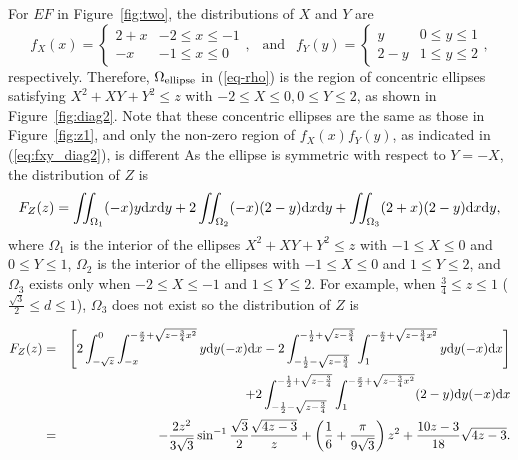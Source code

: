 \documentclass[12pt,draftclsnofoot,onecolumn]{IEEEtran}
\begin{document}
For $EF$ in Figure~\ref{fig:two}, the distributions of $X$ and $Y$ are
\begin{equation}\label{eq:fxy_diag2}
  f_X(x)=\left\{
    \begin{array}{lr}
      2+x & -2\leq x \leq -1 \\
      -x & -1 \leq x \leq 0
    \end{array}
  \right.,
  ~~\mbox{ and }~~ f_Y(y)=\left\{
    \begin{array}{lr}
      y & 0\leq y \leq 1 \\
      2-y & 1 \leq y \leq 2
    \end{array}
  \right.,
\end{equation}
respectively.
Therefore, $\Omega_{\rm ellipse}$ in (\ref{eq-rho})
is the region of concentric ellipses satisfying $X^2+XY+Y^2 \leq z$ with $-2 \leq X \leq 0,
0\leq Y \leq 2$, as shown in Figure~\ref{fig:diag2}.
Note that these concentric ellipses are
the same as those in Figure~\ref{fig:z1}, and only the non-zero
region of $f_X(x)f_Y(y)$, as indicated in (\ref{eq:fxy_diag2}),
is different
As the ellipse is symmetric with respect to $Y=-X$, the distribution of $Z$ is
\begin{equation}
\label{eq:fz_shortdiag}
 F_Z(z)=\iint_{\Omega_1}(-x)y{\rm d}x{\rm d}y+2\iint_{\Omega_2}(-x)(2-y){\rm
d}x{\rm d}y+\iint_{\Omega_3}(2+x)(2-y){\rm d}x{\rm d}y,
\end{equation}
where $\Omega_1$ is the interior of the ellipses $X^2+XY+Y^2 \leq z$ with $-1 \leq X
\leq 0$ and $0 \leq Y \leq 1$, $\Omega_2$ is the interior of the ellipses with
$-1 \leq X \leq 0$ and $1 \leq Y \leq 2$, and $\Omega_3$ exists only when $-2 \leq X \leq
-1$ and $1 \leq Y \leq 2$.
For example, when $\frac{3}{4} \leq z \leq 1$ ($\frac{\sqrt{3}}{2} \leq d \leq 1$),
$\Omega_3$ does not exist so the distribution of $Z$ is
\begin{small}
 \begin{eqnarray}\label{eq:Z2_r_diag2}
 F_Z(z)&=&\left[2\int_{-\sqrt{z}}^0\int_{-x}^{-\frac{x}{2}+\sqrt{z-\frac{3}{4}
x^2}}y{\rm d}y(-x){\rm
d}x-2\int_{-\frac{1}{2}-\sqrt{z-\frac{3}{4}}}^{-\frac{1}{2}+\sqrt{
z-\frac{3}{4}}}\int_1^{-\frac{x}{2}+\sqrt{z-\frac{3}{4}x^2}}y{\rm d}y(-x){\rm
d}x\right] \nonumber\\
&&+2\int_{-\frac{1}{2}-\sqrt{z-\frac{3}{4}}}^{-\frac{1}{2}+\sqrt{z-\frac{3}{4}}}
\int_1^{-\frac{x}{2}+\sqrt{z-\frac{3}{4}x^2}}(2-y){\rm d}y(-x){\rm d}x
\nonumber\\
&=&-\frac{2z^2}{3\sqrt{3}}\sin^{-1}\frac{\sqrt{3}}{2}\frac{\sqrt{4z-3}}{z}
+\left(\frac{1}{6}+\frac{\pi}{9\sqrt{3}}\right)z^2+\frac{10z-3}{18}\sqrt{4z-3}.
\end{eqnarray}
\end{small}
\end{document}
